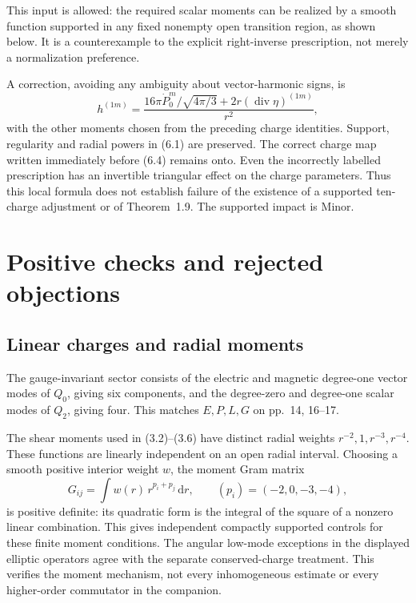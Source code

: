\documentclass[10pt]{article}
\begin{document}
This input is allowed: the required scalar moments can be realized by a smooth function supported in any fixed nonempty open transition region, as shown below. It is a counterexample to the explicit right-inverse prescription, not merely a normalization preference.\par
A correction, avoiding any ambiguity about vector-harmonic signs, is \[h^{(1m)}
  =\frac{16\pi\dot P_0^m/\sqrt{4\pi/3}
                +2r(\operatorname{div}\eta)^{(1m)}}{r^2},\] with the other moments chosen from the preceding charge identities. Support, regularity and radial powers in (6.1) are preserved. The correct charge map written immediately before (6.4) remains onto. Even the incorrectly labelled prescription has an invertible triangular effect on the charge parameters. Thus this local formula does not establish failure of the existence of a supported ten-charge adjustment or of Theorem 1.9. The supported impact is Minor.\par
\section*{Positive checks and rejected objections}
\subsection*{Linear charges and radial moments}
The gauge-invariant sector consists of the electric and magnetic degree-one vector modes of \(Q_0\), giving six components, and the degree-zero and degree-one scalar modes of \(Q_2\), giving four. This matches \(E,P,L,G\) on pp. 14, 16–17.\par
The shear moments used in (3.2)–(3.6) have distinct radial weights \(r^{-2},1,r^{-3},r^{-4}\). These functions are linearly independent on an open radial interval. Choosing a smooth positive interior weight \(w\), the moment Gram matrix \[G_{ij}=\int w(r)\,r^{p_i+p_j}\,\mathrm dr,
       \qquad (p_i)=( -2,0,-3,-4),\] is positive definite: its quadratic form is the integral of the square of a nonzero linear combination. This gives independent compactly supported controls for these finite moment conditions. The angular low-mode exceptions in the displayed elliptic operators agree with the separate conserved-charge treatment. This verifies the moment mechanism, not every inhomogeneous estimate or every higher-order commutator in the companion.\par
\end{document}
